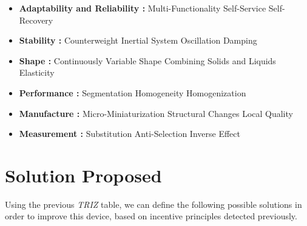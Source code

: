 \documentclass[12pt, twoside]{report}
\begin{document}
\begin{itemize}
\item \textbf{Adaptability and Reliability :}
\subitem Multi-Functionality
\subitem Self-Service
\subitem Self-Recovery
\item \textbf{Stability :}
\subitem Counterweight
\subitem Inertial System
\subitem Oscillation Damping
\item \textbf{Shape :}
\subitem Continuously Variable Shape
\subitem Combining Solids and Liquids
\subitem Elasticity
\item \textbf{Performance :}
\subitem Segmentation
\subitem Homogeneity
\subitem Homogenization
\item \textbf{Manufacture :}
\subitem Micro-Miniaturization
\subitem Structural Changes
\subitem Local Quality
\item \textbf{Measurement :}
\subitem Substitution
\subitem Anti-Selection
\subitem Inverse Effect
\end{itemize}


\section{Solution Proposed}

Using the previous \textit{TRIZ} table, we can define the following possible solutions in order to improve this device, based on incentive principles detected previously.
\end{document}
